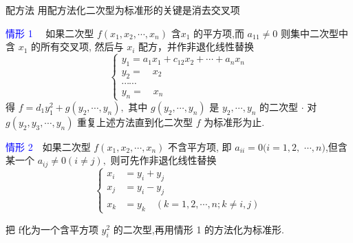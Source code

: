 \documentclass[13pt]{beamer}
\newcommand{\blue}{\textcolor{blue}}
\begin{document}
\begin{frame}{配方法}
用配方法化二次型为标准形的关键是消去交叉项

\blue{情形 1}~~ 如果二次型 $f\left(x_{1}, x_{2}, \cdots, x_{n}\right)$ 含$x_1$ 的平方项,而 $a_{11} \neq 0$
则集中二次型中含 $x_1$ 的所有交叉项, 然后与 $x_i$ 配方，并作非退化线性替换
\[
\left\{\begin{array}{l}
y_{1}=a_{1} x_{1}+c_{12} x_{2}+\cdots+a_{n} x_{n} \\
y_{2}= \quad x_2\\
\cdots \cdots \\
y_{n}= \quad x_n
\end{array} \right.
\]
得 $f=d_{1} y_{1}^{2}+g\left(y_{2}, \cdots, y_{n}\right),$ 其中 $g\left(y_{2}, \cdots, y_{n}\right)$ 是 $y_{2}, \cdots, y_{n}$ 的二次型 $\cdot$ 对
$g\left(y_{2}, y_{3}, \cdots, y_{n}\right)$ 重复上述方法直到化二次型 $f$ 为标准形为止.
\end{frame}
\begin{frame}
\blue{情形 2}~~如果二次型 $f\left(x_{1}, x_{2}, \cdots, x_{n}\right)$ 不含平方项, 即 $a_{i i}=0(i=1,2,$
$\cdots, n)$,但含某一个 $a_{i j} \neq 0(i \neq j),$ 则可先作非退化线性替换
$$\left\{\begin{aligned} x_{i} &=y_{i}+y_{j} \\ x_{j} &=y_{i}-y_{j} \\ x_{k} &=y_{k} \quad(k=1,2, \cdots, n ; k \neq i, j) \end{aligned}\right.$$

把 f化为一个含平方项 $y_{i}^{2}$ 的二次型,再用情形 1 的方法化为标准形.
\end{frame}

\end{document}
